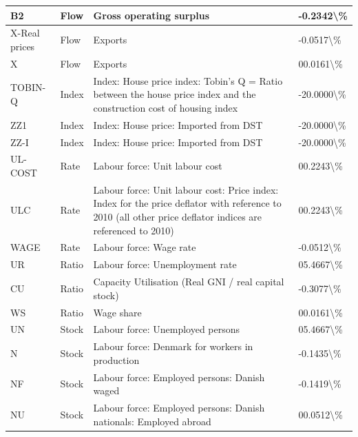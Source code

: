 \documentclass[
]{book}
\begin{document}
\begin{table}
\begin{tabular}[t]{l|l|l|l}
\hline
B2 & Flow & Gross operating surplus & -0.2342\textbackslash{}\%\\
\hline
X-Real prices & Flow & Exports & -0.0517\textbackslash{}\%\\
\hline
X & Flow & Exports & 00.0161\textbackslash{}\%\\
\hline
TOBIN-Q & Index & Index: House price index: Tobin's Q = Ratio between the house price index and the construction cost of housing index & -20.0000\textbackslash{}\%\\
\hline
ZZ1 & Index & Index: House price: Imported from DST & -20.0000\textbackslash{}\%\\
\hline
ZZ-I & Index & Index: House price: Imported from DST & -20.0000\textbackslash{}\%\\
\hline
UL-COST & Rate & Labour force: Unit labour cost & 00.2243\textbackslash{}\%\\
\hline
ULC & Rate & Labour force: Unit labour cost: Price index: Index for the price deflator with reference to 2010 (all other price deflator indices are referenced to 2010) & 00.2243\textbackslash{}\%\\
\hline
WAGE & Rate & Labour force: Wage rate & -0.0512\textbackslash{}\%\\
\hline
UR & Ratio & Labour force: Unemployment rate & 05.4667\textbackslash{}\%\\
\hline
CU & Ratio & Capacity Utilisation (Real GNI  /  real capital stock) & -0.3077\textbackslash{}\%\\
\hline
WS & Ratio & Wage share & 00.0161\textbackslash{}\%\\
\hline
UN & Stock & Labour force: Unemployed persons & 05.4667\textbackslash{}\%\\
\hline
N & Stock & Labour force: Denmark for workers in production & -0.1435\textbackslash{}\%\\
\hline
NF & Stock & Labour force: Employed persons: Danish waged & -0.1419\textbackslash{}\%\\
\hline
NU & Stock & Labour force: Employed persons: Danish nationals: Employed abroad & 00.0512\textbackslash{}\%\\
\hline
\end{tabular}
\end{table}
\end{document}
